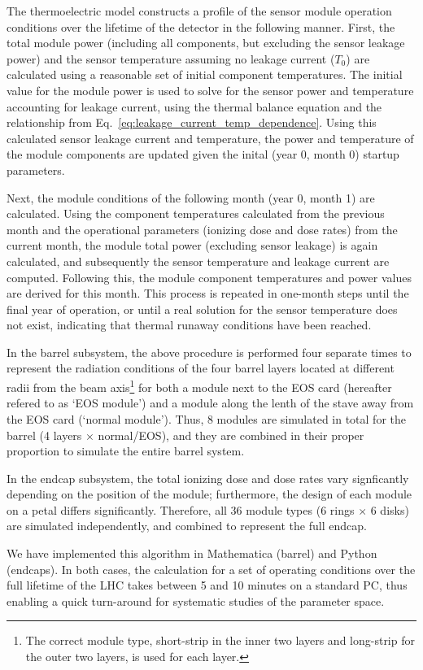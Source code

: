 \label{sec:running}
The thermoelectric model constructs a profile of the sensor module operation conditions over the
lifetime of the detector in the following manner. First, the total module power (including all components, but excluding the sensor
leakage power) and the sensor temperature assuming no leakage current ($T_0$) are calculated 
using a reasonable set of initial component temperatures.
The initial value for the module power is used to solve for the sensor power and temperature accounting
for leakage current, using the thermal balance equation and the relationship from
Eq.~\ref{eq:leakage_current_temp_dependence}.
Using this calculated sensor leakage current and temperature, the power and temperature of the module
components are updated given the inital (year 0, month 0) startup parameters.

Next, the module conditions of the following month (year 0, month 1) are calculated. Using the component
temperatures calculated from the previous month and the operational parameters (ionizing dose and dose
rates) from the current month, the module total power (excluding sensor leakage) is again calculated, and
subsequently the sensor temperature and leakage current are computed. Following this,
the module component temperatures and power values are derived for this month. This process is repeated in one-month
steps until the final year of operation, or until a real solution for the sensor temperature does not
exist, indicating that thermal runaway conditions have been reached.

In the barrel subsystem, the above procedure is performed four separate times to
represent the radiation conditions of the four barrel layers located at different radii from the beam axis\footnote{The correct module type, short-strip in the inner two layers and long-strip for the outer two layers, is used for each layer.} for both a module next to the EOS card (hereafter refered to as `EOS module') and a module along the lenth of the stave away from the EOS card (`normal module'). Thus, 8 modules are simulated in total for the barrel (4 layers $\times$ normal/EOS), and they are combined in their proper proportion to simulate the entire barrel system.

In the endcap subsystem, the total ionizing dose and dose rates vary signficantly depending on the
position of the module; furthermore, the design of each module on a petal differs significantly.
Therefore, all 36 module types (6 rings $\times$ 6 disks) are simulated independently, and combined to
represent the full endcap.

We have implemented this algorithm in Mathematica (barrel) and Python (endcaps). In both cases, the calculation for a set of operating conditions over the full lifetime of the LHC takes between 5 and 10 minutes on a standard PC, thus enabling a quick turn-around for systematic studies of the parameter space.

